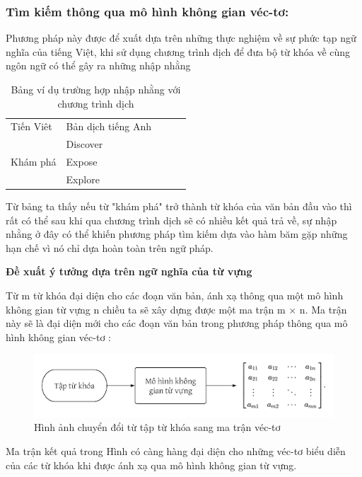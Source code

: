 \documentclass[12pt]{report}
\begin{document}
\subsubsection{Tìm kiếm thông qua mô hình không gian véc-tơ:}
Phương pháp này được để xuất dựa trên những thực nghiệm về sự phức tạp ngữ nghĩa của tiếng Việt, khi sử dụng chương trình dịch để đưa bộ từ khóa về cùng ngôn ngữ có thể gây ra những nhập nhằng

\begin{table}[H]
	\centering
	\caption{Bảng ví dụ trường hợp nhập nhằng với chương trình dịch}
	\begin{tabular}{|l|l|lll}
	\cline{1-2}
	Tiến Viêt                 & Bản dịch tiếng Anh &  &  &  \\ \cline{1-2}
	\multirow{3}{*}{Khám phá} & Discover           &  &  &  \\ \cline{2-2}
														& Expose             &  &  &  \\ \cline{2-2}
														& Explore            &  &  &  \\ \cline{1-2}
	\end{tabular}
\end{table}

Từ bảng ta thấy nếu từ "khám phá" trở thành từ khóa của văn bản đầu vào thì rất có thể sau khi qua chương trình dịch sẽ có nhiều kết quả trả về, sự nhập nhằng ở đây có thể khiến phương pháp tìm kiếm dựa vào hàm băm gặp những hạn chế vì nó chỉ dựa hoàn toàn trên ngữ pháp.

\noindent\textbf{Đề xuất ý tưởng dựa trên ngữ nghĩa của từ vựng}

Từ m từ khóa đại diện cho các đoạn văn bản, ánh xạ thông qua một mô hình không gian từ vựng n chiều ta sẽ xây dựng được một ma trận m $\times$ n. Ma trận này sẽ là đại diện mới cho các đoạn văn bản trong phương pháp thông qua mô hình không gian véc-tơ :
\begin{figure}[h]
	\centering
	\includegraphics[scale=0.8]{vectornize}
	\caption{Hình ảnh chuyển đổi từ tập từ khóa sang ma trận véc-tơ}
\end{figure}

Ma trận kết quả trong Hình có càng hàng đại diện cho những véc-tơ biểu diễn của các từ khóa khi được ánh xạ qua mô hình không gian từ vựng.
\end{document}
